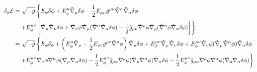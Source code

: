 \begin{align*}
  \delta_\phi\mathcal{E} &=\sqrt{-\tilde{g}}\left\{E_\phi\delta\phi +E^\mu_\phi \tilde{\nabla}_\mu\delta\phi -\frac{1}{2}E_{\mu\nu }\tilde{g}^{\mu\nu }\tilde{\nabla}^\alpha \tilde{\nabla}_\alpha \delta\phi \right.\\
  &  \quad \left. + E^{\mu\nu }_\phi \left[\tilde{\nabla}_\mu \tilde{\nabla}_\nu \delta\phi +\tilde{\nabla}_\nu\phi\tilde{\nabla}_\mu (\tilde{\nabla}^\alpha\tilde{\nabla}_\alpha\delta\phi )-\frac{1}{2}\tilde{g}_{\mu\nu }\tilde{\nabla}^\rho\phi\tilde{\nabla}_\rho (\tilde{\nabla}^\alpha\phi\tilde{\nabla}_\alpha\delta\phi )\right]\right\} \\
  &=\sqrt{-\tilde{g}}\left\{E_\phi\delta_\phi+\left(E^\mu_\phi\tilde{\nabla}_\mu-\frac{1}{2}E_{\rho\tau }\tilde{g}^{\rho\tau }\tilde{\nabla}^\mu\phi \right)\tilde{\nabla}_\mu\delta\phi +E^{\mu\nu }_\beta\tilde{\nabla}_\mu\tilde{\nabla}_\nu \delta\phi +E^{\mu\nu }_\phi\tilde{\nabla}_\nu \phi(\tilde{\nabla}_\mu \tilde{\nabla}^\alpha\phi )\tilde{\nabla}_\alpha\delta\phi \right.\\
  &\left.\quad + E^{\mu\nu }_\phi\tilde{\nabla}_\nu\phi\tilde{\nabla}^\alpha \phi(\tilde{\nabla}_\mu\tilde{\nabla}_\alpha\delta\phi )-\frac{1}{2}E^{\mu\nu}_\phi \tilde{g}_{\mu\nu }\tilde{\nabla}^\rho\phi(\tilde{\nabla}_\rho\tilde{\nabla}^\alpha \phi )\tilde{\nabla}_\alpha\delta\phi  -\frac{1}{2}E^{\mu\nu }_\phi\tilde{g}_{\mu\nu }\tilde{\nabla}^\rho\phi\tilde{\nabla}^\alpha\phi(\tilde{\nabla}_\rho\tilde{\nabla}_\alpha\delta\phi )\right\}
\end{align*}

